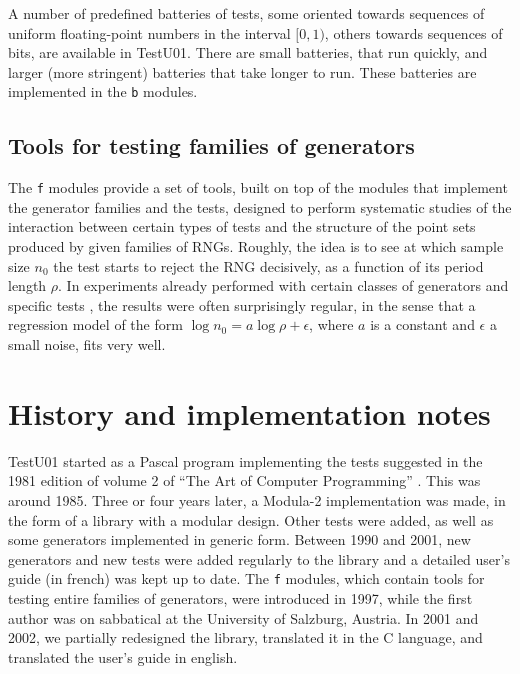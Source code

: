A number of predefined batteries of tests, some oriented towards
sequences of uniform floating-point numbers in the interval $[0, 1)$,
others towards sequences of bits, are available in TestU01.
There are small batteries, that run quickly, and larger 
(more stringent) batteries that take longer to run. 
These batteries are implemented in the {\tt b} modules.


\subsection {Tools for testing families of generators}

The {\tt f} modules provide a set of tools, built on top of
the modules that implement the generator families and the tests,
designed to perform systematic studies of
the interaction between certain types of tests and the structure
of the point sets produced by given families of RNGs.
Roughly, the idea is to see at which sample size $n_0$ the test starts
to reject the RNG decisively, as a function of its period length $\rho$.
In experiments already performed with certain classes of generators
and specific tests \cite{rLEC98h,rLEC00c,rLEC01a}, 
the results were often surprisingly regular,
in the sense that a regression model of the form
$\log n_0 = a \log\rho + \epsilon$, where $a$ is a constant
and $\epsilon$ a small noise, fits very well.


\section {History and implementation notes}


{TestU01} started as a Pascal program implementing the tests suggested
in the 1981 edition of volume 2 of ``The Art of Computer Programming''
\cite{rKNU81a}. This was around 1985.
Three or four years later, a Modula-2 implementation was made, in the
form of a library with a modular design.
Other tests were added, as well as some generators implemented in
generic form.  Between 1990 and 2001, new generators and new tests were
added regularly to the library and a detailed user's guide (in french)
was kept up to date.  The {\tt f} modules, which contain
tools for testing entire families of generators, were introduced in 
1997, while the first author was on sabbatical at the University of 
Salzburg, Austria.
In 2001 and 2002, we partially redesigned the library,
translated it in the C language, 
and translated the user's guide in english.

